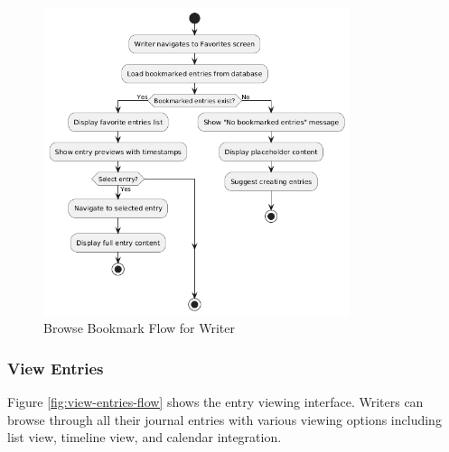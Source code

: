 \begin{figure}[H]
\centering
\includegraphics[width=0.8\textwidth]{files/imgs/browse_bookmark_flow.png}
\caption{Browse Bookmark Flow for Writer}
\label{fig:browse-bookmark-flow}
\end{figure}

\subsubsection{View Entries}\label{subsubsec:viewEntries}

Figure \ref{fig:view-entries-flow} shows the entry viewing interface. Writers can browse through all their journal entries with various viewing options including list view, timeline view, and calendar integration.

